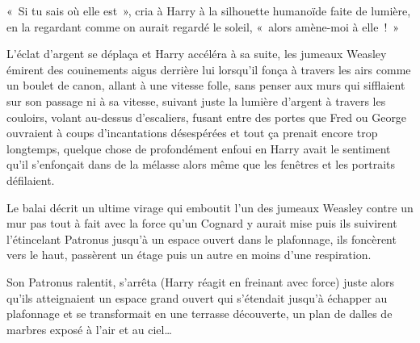 «~Si tu sais où elle est~», cria à Harry à la silhouette humanoïde faite de lumière, en la regardant comme on aurait regardé le soleil, «~alors amène-moi à elle~!~»

L'éclat d'argent se déplaça et Harry accéléra à sa suite, les jumeaux Weasley émirent des couinements aigus derrière lui lorsqu'il fonça à travers les airs comme un boulet de canon, allant à une vitesse folle, sans penser aux murs qui sifflaient sur son passage ni à sa vitesse, suivant juste la lumière d'argent à travers les couloirs, volant au-dessus d'escaliers, fusant entre des portes que Fred ou George ouvraient à coups d'incantations désespérées et tout ça prenait encore trop longtemps, quelque chose de profondément enfoui en Harry avait le sentiment qu'il s'enfonçait dans de la mélasse alors même que les fenêtres et les portraits défilaient.

Le balai décrit un ultime virage qui emboutit l'un des jumeaux Weasley contre un mur pas tout à fait avec la force qu'un Cognard y aurait mise puis ils suivirent l'étincelant Patronus jusqu'à un espace ouvert dans le plafonnage, ils foncèrent vers le haut, passèrent un étage puis un autre en moins d'une respiration.

Son Patronus ralentit, s'arrêta (Harry réagit en freinant avec force) juste alors qu'ils atteignaient un espace grand ouvert qui s'étendait jusqu'à échapper au plafonnage et se transformait en une terrasse découverte, un plan de dalles de marbres exposé à l'air et au ciel…
